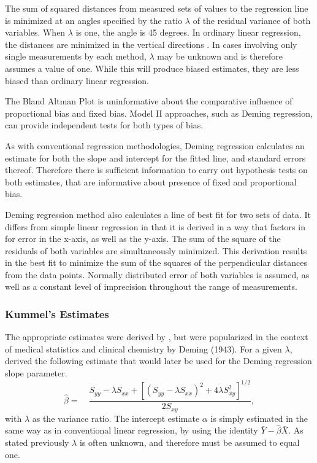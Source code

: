\documentclass[12pt, a4paper]{report}
\theoremstyle{plain}
\theoremstyle{definition}
\theoremstyle{remark}
\begin{document}
	The sum of squared distances from measured sets of values to the regression line is minimized at an angles specified by the ratio $\lambda$ of the residual variance of both variables. When $\lambda$ is one, the angle is 45 degrees. In ordinary linear regression, the distances are minimized in the vertical directions \citep{linnet99}.
	In cases involving only single measurements by each method, $\lambda$ may be unknown and is therefore assumes a value of one. While this will produce biased estimates, they are less biased than ordinary linear regression.
	
	The Bland Altman Plot is uninformative about the comparative influence of proportional bias and fixed bias. Model II approaches, such as Deming regression,  can provide independent tests for
	both types of bias.
	
	As with conventional regression methodologies, Deming regression calculates an estimate for both the slope and intercept for the
	fitted line, and standard errors thereof. Therefore there is sufficient information to carry out hypothesis tests on both
	estimates, that are informative about presence of fixed and proportional bias.
	
	Deming regression method also calculates a line of best fit for two sets of data. It differs from simple linear regression in that it is derived in a way that factors in for error in the x-axis, as well as the y-axis. The sum of the square of the residuals of both variables are simultaneously minimized. This derivation results in the best fit to minimize the sum of the squares of the perpendicular distances from the data points. Normally distributed error of both variables is assumed, as well as a constant level of imprecision throughout the range of measurements.
	
	
	\subsubsection{Kummel's Estimates}
	
	The appropriate estimates were derived by \citet{Kummel}, but were popularized in the context of medical statistics and clinical chemistry by Deming (1943).
	For a given $\lambda$, \citet{Kummel} derived the following estimate that would later be used for the Deming regression slope
	parameter. 
	\begin{equation}
	\hat{\beta} =\quad \frac{S_{yy} - \lambda S_{xx}+[(S_{yy} -
		\lambda S_{xx})^{2}+ 4\lambda S^{2}_{xy}]^{1/2}}{2S_{xy}},
	\end{equation}
	with $\lambda$ as the variance ratio. The intercept estimate $\alpha$ is simply estimated in the same way as in conventional linear
	regression, by using the identity $\bar{Y}-\hat{\beta}\bar{X}$. As stated previously $\lambda$ is often unknown, and therefore must be assumed to equal one. 
	
\end{document}
